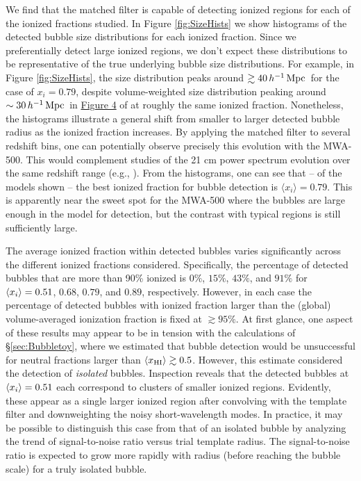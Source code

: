 We find that the matched filter is capable of detecting ionized
regions for each of the ionized fractions studied. In
Figure \ref{fig:SizeHists} we show histograms of the detected
bubble size distributions for each ionized fraction. Since
we preferentially detect large ionized regions, we don't
expect these distributions to be representative of the
true underlying bubble size distributions. For example, in Figure
\ref{fig:SizeHists}, the size distribution peaks around $\gtrsim40\,h^{-1}\,{\rm Mpc}\,$ for
the case of $x_i = 0.79$, despite volume-weighted size distribution peaking around $\sim 30\,h^{-1}\,{\rm Mpc}\,$ in
\href{http://iopscience.iop.org/0004-637X/654/1/12/fulltext/65071.fg4.html}{Figure
  4} of \citet{Zahn:2006sg} at roughly the same ionized fraction. Nonetheless,
the histograms illustrate a general shift from smaller to larger detected
bubble radius as the ionized fraction increases. By applying
the matched filter to several redshift bins, one can potentially
observe precisely this evolution with the MWA-500. This would
complement studies of the 21 cm power spectrum evolution over
the same redshift range (e.g., \citealt{Lidz:2007az}). From
the histograms, one can see that -- of the models shown -- the 
best ionized fraction
for bubble detection is $\langle x_i \rangle = 0.79$. This is apparently near the sweet spot for the MWA-500 where
the bubbles are large enough in the model for detection, but
the contrast with typical regions is still sufficiently large.

The average ionized fraction within detected bubbles varies
significantly across the different ionized fractions considered.
Specifically, the percentage of detected bubbles that are more than
90\% ionized is $0\%$, $15\%$, $43\%$, and $91\%$ for $\langle x_{i} \rangle = 0.51$,
$0.68$, $0.79$, and $0.89$, respectively.  However, in each case the
percentage of detected bubbles with ionized fraction larger than the
(global) volume-averaged ionization fraction is fixed at $\gtrsim 95\%$. At
first glance, one aspect of these results may appear to be in tension
with the calculations of \S\ref{sec:Bubbletoy}, where we estimated that
bubble detection would be unsuccessful for neutral fractions larger
than $\langle x_{\rm HI}\rangle \gtrsim 0.5$.  However, this estimate
considered the detection of {\em isolated} bubbles. Inspection reveals
that the detected bubbles at $\langle x_{i} \rangle = 0.51$ each correspond to clusters
of smaller ionized regions. Evidently, these appear as a single larger ionized
region after convolving with the template filter and downweighting
the noisy short-wavelength modes. In practice, it may be possible to distinguish
this case from that of an isolated bubble by analyzing the trend of 
signal-to-noise ratio versus trial template radius. The signal-to-noise
ratio is expected to grow more rapidly with radius (before reaching the bubble
scale) for a truly isolated
bubble.


